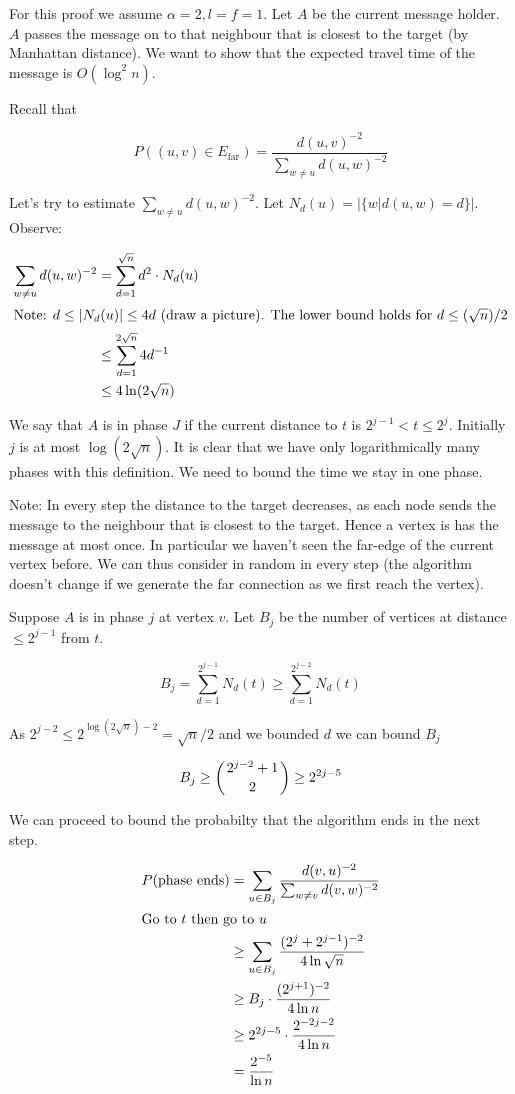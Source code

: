 \begin{pr} For this proof we assume $\alpha=2,l=f=1$. Let $A$ be the current message holder. $A$ passes the message on to that neighbour that is closest to the target (by Manhattan distance). We want to show that the expected travel time of the message is $O(\log^2n)$.

Recall that 

\[P((u,v)\in E_{\text{far}}) = \frac{d(u,v)^{-2}}{\sum_{w\neq u}d(u,w)^{-2}}\]

Let's try to estimate $\sum_{w\neq u}d(u,w)^{-2}$. Let $N_d(u) = |\{w|d(u,w)=d\}|$. Observe:

\begin{align*}
\sum_{w\neq u}d(u,w)^{-2} &= \sum_{d=1}^{\sqrt n} d^2\cdot N_d(u)\\
\intertext{Note: $d\leq |N_d(u)|\leq 4d$ (draw a picture). The lower bound holds for $d\leq (\sqrt n) /2$}
	&\leq \sum_{d=1}^{2\sqrt n} 4 d^{-1}\\
	&\leq 4 \ln(2\sqrt{n})
\end{align*}

We say that $A$ is in phase $J$ if the current distance to $t$ is $2^{j-1} < t \leq 2^j$. Initially $j$ is at most $\log (2\sqrt n)$. It is clear that we have only logarithmically many phases with this definition. We need to bound the time we stay in one phase.

Note: In every step the distance to the target decreases, as each node sends the message to the neighbour that is closest to the target. Hence a vertex is has the message at most once. In particular we haven't seen the far-edge of the current vertex before. We can thus consider in random in every step (the algorithm doesn't change if we generate the far connection as we first reach the vertex).

Suppose $A$ is in phase $j$ at vertex $v$. Let $B_j$ be the number of vertices at distance $\leq 2^{j-1}$ from $t$. 

\[B_j = \sum_{d=1}^{2^{j-1}} N_d(t)\geq \sum_{d=1}^{2^{j-2}} N_d(t)\]

As $2^{j-2} \leq 2^{\log(2\sqrt{n})-2} = \sqrt{n}/2$ and we bounded $d$ we can bound $B_j$

\[B_j \geq \left( {2^{j-2}+1} \atop 2 \right) \geq 2^{2j-5}\]

We can proceed to bound the probabilty that the algorithm ends in the next step.

\begin{align*}
P(\text{phase ends}) &= \sum_{u\in B_j} \frac{d(v,u)^{-2}}{\sum_{w\neq v} d(v,w)^{-2}}\\
\intertext{Go to $t$ then go to $u$}
&\geq \sum_{u\in B_j} \frac{(2^j+2^{j-1})^{-2}}{4\ln \sqrt{n}}\\
&\geq B_j \cdot \frac{(2^{j+1})^{-2}}{4\ln n}\\
&\geq 2^{2j-5} \cdot \frac{2^{-2j-2}}{4\ln n}\\
&=\frac{2^{-5}}{\ln n}
\end{align*}


\end{pr}
